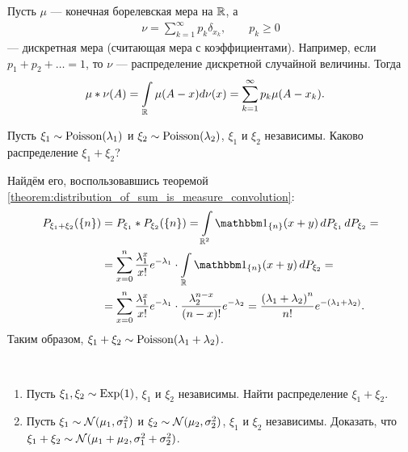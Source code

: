 \documentclass[../main.tex]{subfiles}
\begin{document}
\begin{exmpl}
 Пусть $ \mu $ --- конечная борелевская  мера на $ \mathbb{R}$, а
 \begin{align*}
  \nu = \sum_{k=1}^{\infty} p_k \delta_{x_k}, \qquad p_k \geqslant 0
 \end{align*} --- дискретная мера (считающая мера с коэффициентами). Например, если $ p_1 + p_2 + \ldots = 1 $, то $ \nu $ --- распределение дискретной случайной величины. Тогда
 \begin{align*}
  \mu \ast \nu(A) &= \int\limits_{\mathbb{R}} \mu(A - x) d\nu(x) = \sum_{k=1}^{\infty}p_k \mu(A - x_k).
 \end{align*} 
\end{exmpl}
\begin{exmpl}
 Пусть $ \xi_1 \sim \mathrm{Poisson}(\lambda_1) $ и $ \xi_2 \sim \mathrm{Poisson}(\lambda_2) $, $ \xi_1 $  и $ \xi_2 $ независимы. Каково распределение $ \xi_1 + \xi_2 $?

 Найдём его, воспользовавшись теоремой \ref{theorem:distribution_of_sum_is_measure_convolution}:
 \begin{align*}
  P_{\xi_1 + \xi_2}(\left\{ n \right\}) &= P_{\xi_1} \ast P_{\xi_2}(\left\{ n \right\}) = \int\limits_{\R^{2}}  \Ind_{\left\{ n \right\}}(x+y)\,dP_{\xi_1}\,dP_{\xi_2} = \\
  &= \sum_{x=0}^{n} \frac{\lambda_1^{x}}{x!} e^{-\lambda_1} \cdot \int\limits_{\R} \Ind_{\left\{ n \right\}}(x+y) \, dP_{\xi_2} = \\
  &= \sum_{x=0}^{n} \frac{\lambda_1^{x}}{x!}e^{-\lambda_1} \cdot \frac{\lambda_2^{n-x}}{(n-x)!}e^{-\lambda_2} = \frac{\left( \lambda_1 + \lambda_2 \right)^{n}}{n!}e^{-(\lambda_1 + \lambda_2)}.
 \end{align*} Таким образом, $ \xi_1 + \xi_2 \sim \mathrm{Poisson}(\lambda_1 + \lambda_2) $.
\end{exmpl}

\begin{exercs*}\
\begin{enumerate}
 \item Пусть $ \xi_1, \xi_2 \sim \mathrm{Exp}(1) $, $ \xi_1 $ и $ \xi_2 $ независимы. Найти распределение $ \xi_1 + \xi_2 $.
 \item Пусть $ \xi_1 \sim \mathcal N(\mu_1, \sigma_1^{2}) $ и $ \xi_2 \sim \mathcal N(\mu_2, \sigma_2^{2}) $, $ \xi_1 $ и $ \xi_2 $ независимы. Доказать, что $ \xi_1 + \xi_2 \sim \mathcal N(\mu_1 + \mu_2, \sigma_1^{2} + \sigma_2^{2}) $.
\end{enumerate}
\end{exercs*}
\end{document}
